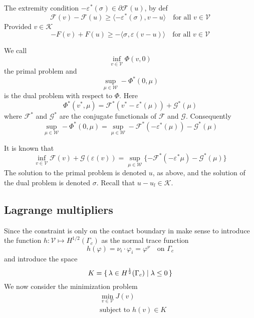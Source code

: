\documentclass[12pt,a4paper]{article}
\numberwithin{equation}{section}
\numberwithin{table}{section}
\numberwithin{figure}{section}
\newcommand{\W}{\ensuremath{\mathcal{W}}}
\newcommand{\half}{\ensuremath{\frac{1}{2}}}
\newcommand{\V}{\ensuremath{\mathcal{V}}}
\newcommand{\K}{\ensuremath{\mathcal{K}}}
\newcommand{\F}{\ensuremath{{\mathcal F}}}
\newcommand{\G}{\ensuremath{{\mathcal G}}}
\renewcommand{\epsilon}{\varepsilon}
\renewcommand{\phi}{\varphi}
\newcommand{\strain}[1][]{\ensuremath{\epsilon_{#1}}}
\newcommand{\stress}[1][]{\ensuremath{\sigma_{#1}}}
\providecommand{\dualp}[2]{\langle #1, #2 \rangle}
\newcommand{\infvinV}{\ensuremath{\inf_{v\in \V}}}
\begin{document}
The extremity condition $-\strain^*(\stress) \in \partial \F(u)$, by def
\begin{equation}
	\F(v) - \F(u) \geq \dualp{-\strain^*(\stress)}{v-u} \quad\text{for all $v\in\V$}
\end{equation}
Provided $v\in\K$
\begin{equation}
	-F(v) + F(u) \geq -\dualp{\stress}{\strain(v-u)} \quad\text{for all $v\in\V$}
\end{equation}


We call
\begin{equation}
  \infvinV \varPhi(v, 0)
\end{equation}
the primal problem and
\begin{equation}
  \sup_{\mu\in \W} -\varPhi^*(0,\mu)
\end{equation}
is the dual problem with respect to $\varPhi$.  Here
\begin{equation}
  \varPhi^*(v^*,\mu) = \F^*(v^*-\epsilon^*(\mu)) + \G^*(\mu)
\end{equation}
where $\F^*$ and $\G^*$ are the conjugate functionals of $\F$ and $\G$.  Consequently
\begin{equation}
  \sup_{\mu\in \W} -\varPhi^*(0,\mu)
  = \sup_{\mu\in \W} -\F^*(-\epsilon^*(\mu)) - \G^*(\mu)
\end{equation}

It is known that
\begin{equation}
  \label{eq:PrimalDualNoGap}
  \infvinV \F(v) + \G(\strain(v))
  = \sup_{\mu\in \W} \{ - \F^*(-\strain^* \mu) - \G^*(\mu) \}
\end{equation}
The solution to the primal problem is denoted $u$, as above, and the solution of the dual
problem is denoted $\sigma$.  Recall that $u-u_l\in \K$. 


\subsection{Lagrange multipliers}

Since the constraint is only on the contact boundary in make sense to introduce the function $h : \V \mapsto H^{1/2}(\Gamma_c)$ as the normal trace function
\begin{equation}
  h(\phi) = \nu_i\cdot\phi_i = \phi^\nu \quad \text{on $\Gamma_c$}
\end{equation}
and introduce the space
\begin{equation}
  K = \set{\lambda \in H^\half(\Gamma_c) | \lambda \le 0}
\end{equation}
We now consider the minimization problem 
\begin{equation}
  \begin{split}
    &\min_{v\in\V} J(v) \\
    &\text{subject to $h(v) \in K$}
  \end{split}
\end{equation}
\end{document}
